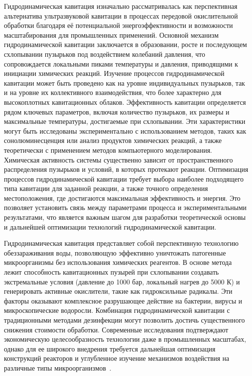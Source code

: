 Гидродинамическая кавитация изначально рассматривалась как перспективная альтернатива ультразвуковой кавитации в процессах передовой окислительной обработки благодаря её потенциальной энергоэффективности и возможности масштабирования для промышленных применений. Основной механизм гидродинамической кавитации заключается в образовании, росте и последующем схлопывании пузырьков под воздействием колебаний давления, что сопровождается локальными пиками температуры и давления, приводящими к инициации химических реакций.
Изучение процессов гидродинамической кавитации может быть проведено как на уровне индивидуальных пузырьков, так и на уровне их коллективного взаимодействия, что более характерно для высокоплотных кавитационных облаков. Эффективность кавитации определяется рядом ключевых параметров, включая количество пузырьков, их размеры и максимальные температуры, достигаемые при схлопывании. Эти характеристики могут быть исследованы экспериментально с использованием методов, таких как сонолюминесценция или анализ продуктов химических реакций, а также теоретически с применением методов компьютерного моделирования.~\cite{10.1016/j.ultsonch.2007.03.00}
Химическая активность системы существенно зависит от пространственного распределения пузырьков и условий, в которых протекают реакции. Оптимизация процессов гидродинамической кавитации требует выбора наиболее подходящего типа кавитации для заданной реакции, а также точного определения местоположения, где достигаются максимальная эффективность и энергия. Это позволяет установить связь между параметрами процесса и экспериментальными результатами, что является важным шагом для разработки теоретической основы и дальнейшей оптимизации технологий гидродинамической кавитации.~\cite{10.1016/j.crhy.2006.10.015}

Гидродинамическая кавитация представляет собой перспективную технологию обеззараживания воды, позволяющую эффективно уничтожать патогенные микроорганизмы без использования химических реагентов. 
В основе метода лежит способность кавитационных пузырей при схлопывании создавать экстремальные условия (давление до 1000 бар, локальный нагрев до 5000 К) и генерировать активные окислители, такие как гидроксильные радикалы. 
Эти факторы оказывают комплексное разрушающее действие на бактерии, вирусы и микроскопические водоросли. 
Комбинация гидродинамической кавитации с традиционными методами дезинфекции могут позволить достичь существенного снижения стоимости обработки. 
Современные исследования подтверждают экономическую целесообразность технологии даже в промышленных масштабах, однако для ее широкого внедрения требуется дальнейшая оптимизация конструкций реакторов и углубленное изучение механизмов воздействия на различные типы микроорганизмов~\cite{10.1016/j.scitotenv.2020.139606}.

